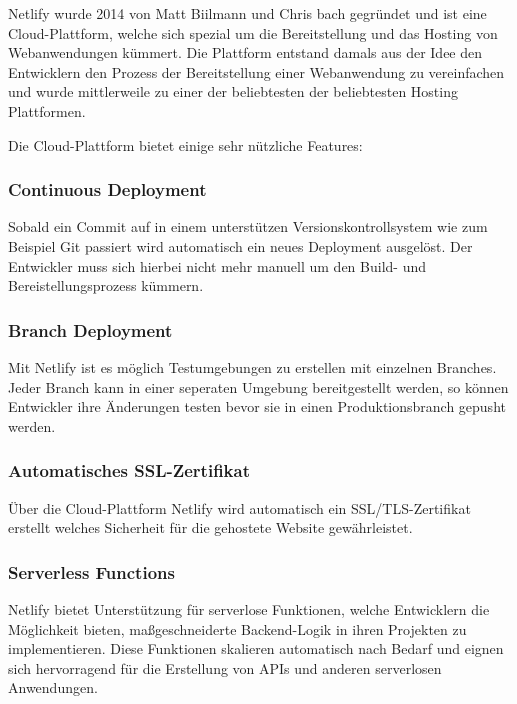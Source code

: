 Netlify wurde 2014 von Matt Biilmann und Chris bach gegründet und ist eine Cloud-Plattform, welche sich spezial um die Bereitstellung und das Hosting von Webanwendungen kümmert. Die Plattform entstand damals aus der Idee den Entwicklern den Prozess der Bereitstellung einer Webanwendung zu vereinfachen und wurde mittlerweile zu einer der beliebtesten der beliebtesten Hosting Plattformen.
\cite{Netlify}

Die Cloud-Plattform bietet einige sehr nützliche Features:

\subsubsection{Continuous Deployment}
Sobald ein Commit auf in einem unterstützen Versionskontrollsystem wie zum Beispiel Git passiert wird automatisch ein neues Deployment ausgelöst. Der Entwickler muss sich hierbei nicht mehr manuell um den Build- und Bereistellungsprozess kümmern.

\subsubsection{Branch Deployment}
Mit Netlify ist es möglich Testumgebungen zu erstellen mit einzelnen Branches. Jeder Branch kann in einer seperaten Umgebung bereitgestellt werden, so können Entwickler ihre Änderungen testen bevor sie in einen Produktionsbranch gepusht werden.

\subsubsection{Automatisches SSL-Zertifikat}
Über die Cloud-Plattform Netlify wird automatisch ein SSL/TLS-Zertifikat erstellt welches Sicherheit für die gehostete Website gewährleistet.

\subsubsection{Serverless Functions}
Netlify bietet Unterstützung für serverlose Funktionen, welche Entwicklern die Möglichkeit bieten, maßgeschneiderte Backend-Logik in ihren Projekten zu implementieren. Diese Funktionen skalieren automatisch nach Bedarf und eignen sich hervorragend für die Erstellung von APIs und anderen serverlosen Anwendungen.

\cite{Was_ist_Netlify}
